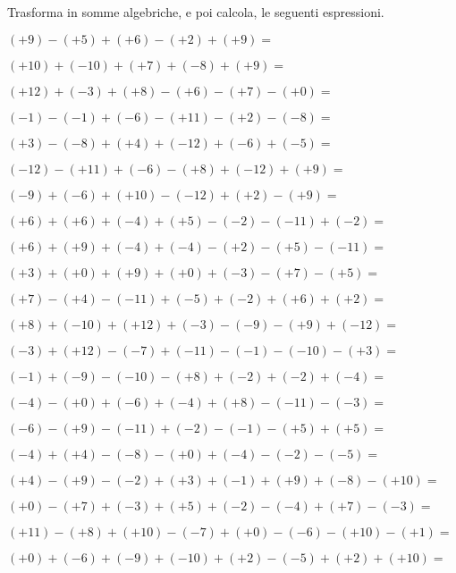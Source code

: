 
\begin{esercizio}
Trasforma in somme algebriche, e poi calcola, le seguenti espressioni.
 \label{ese:as}
 \begin{enumeratees}
\item \((+9) - (+5) + (+6) - (+2) + (+9) =\)
\item \((+10) + (-10) + (+7) + (-8) + (+9) =\)
\item \((+12) + (-3) + (+8) - (+6) - (+7) - (+0) =\)
\item \((-1) - (-1) + (-6) - (+11) - (+2) - (-8) =\)
\item \((+3) - (-8) + (+4) + (-12) + (-6) + (-5) =\)
\item \((-12) - (+11) + (-6) - (+8) + (-12) + (+9) =\)
\item \((-9) + (-6) + (+10) - (-12) + (+2) - (+9) =\)
\item \((+6) + (+6) + (-4) + (+5) - (-2) - (-11) + (-2) =\)
\item \((+6) + (+9) + (-4) + (-4) - (+2) - (+5) - (-11) =\)
\item \((+3) + (+0) + (+9) + (+0) + (-3) - (+7) - (+5) =\)
\item \((+7) - (+4) - (-11) + (-5) + (-2) + (+6) + (+2) =\)
\item \((+8) + (-10) + (+12) + (-3) - (-9) - (+9) + (-12) =\)
\item \((-3) + (+12) - (-7) + (-11) - (-1) - (-10) - (+3) =\)
\item \((-1) + (-9) - (-10) - (+8) + (-2) + (-2) + (-4) =\)
\item \((-4) - (+0) + (-6) + (-4) + (+8) - (-11) - (-3) =\)
\item \((-6) - (+9) - (-11) + (-2) - (-1) - (+5) + (+5) =\)
\item \((-4) + (+4) - (-8) - (+0) + (-4) - (-2) - (-5) =\)
\item \((+4) - (+9) - (-2) + (+3) + (-1) + (+9) + (-8) - (+10) =\)
\item \((+0) - (+7) + (-3) + (+5) + (-2) - (-4) + (+7) - (-3) =\)
\item \((+11) - (+8) + (+10) - (-7) + (+0) - (-6) - (+10) - (+1) =\)
\item \((+0) + (-6) + (-9) + (-10) + (+2) - (-5) + (+2) + (+10) =\)
\end{enumeratees}
\end{esercizio}

